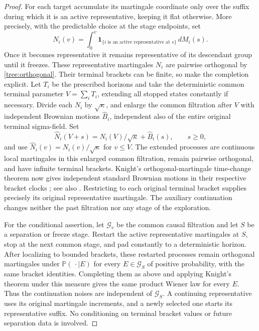 \begin{proof}
For each target accumulate its martingale coordinate only over the
suffix during which it is an active representative, keeping it flat
otherwise.  More precisely, with the predictable choice at the stage
endpoints, set
\[
 N_i(v)=\int_0^v
 \mathbf 1_{\{i\text{ is an active representative at }s\}}\,dM_i(s).
\]
Once it becomes representative it remains representative of its
descendant group until it freezes.  These representative martingales
$N_i$ are pairwise orthogonal by \eqref{tree:orthogonal}.
Their terminal brackets can be finite, so make the completion explicit.
Let $T_i$ be the prescribed horizons and take the deterministic common
terminal parameter $V=\sum_iT_i$, extending all stopped states constantly
if necessary.  Divide each $N_i$ by $\sqrt\kappa$, and enlarge the
common filtration after $V$ with
independent Brownian motions $\widehat B_i$, independent also of the
entire original terminal sigma-field.  Set
\[
 \widehat N_i(V+s)=N_i(V)/\sqrt\kappa+\widehat B_i(s),\qquad s\ge0,
\]
and use $\widehat N_i(v)=N_i(v)/\sqrt\kappa$ for $v\le V$.
The extended processes are continuous local martingales in this
enlarged common filtration, remain pairwise orthogonal, and have
infinite terminal brackets.  Knight's orthogonal-martingale time-change
theorem now gives independent standard Brownian motions in their
respective bracket clocks
\citep[Theorem~V.1.9]{RevuzYor1999}; see also
\citet[Theorem~2]{Meyer1971Knight}.
Restricting to each original terminal bracket supplies precisely its
original representative martingale.  The auxiliary continuation changes
neither the past filtration nor any stage of the exploration.

For the conditional assertion, let $\mathcal G_v$ be the common causal
filtration and let $S$ be a separation or freeze stage.  Restart the
active representative martingales at $S$, stop at the next common stage,
and pad constantly to a deterministic horizon.  After localizing to
bounded brackets, these restarted processes remain orthogonal
martingales under $\mathbb P(\,\cdot\mid E)$ for every $E\in\mathcal G_S$ of
positive probability, with the same bracket identities.  Completing
them as above and applying Knight's theorem under this measure gives
the same product Wiener law for every $E$.  Thus the continuation
noises are independent of $\mathcal G_S$.  A continuing representative
uses its original martingale increments, and a newly selected one
starts its representative suffix.  No conditioning on terminal
bracket values or future separation data is involved.


\end{proof}
